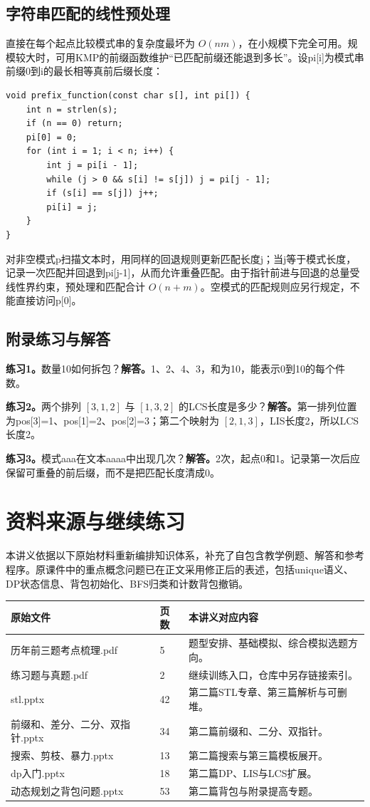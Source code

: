 \subsection{字符串匹配的线性预处理}
直接在每个起点比较模式串的复杂度最坏为 $O(nm)$，在小规模下完全可用。规模较大时，可用KMP的前缀函数维护“已匹配前缀还能退到多长”。设pi[i]为模式串前缀0到i的最长相等真前后缀长度：
\begin{lstlisting}
void prefix_function(const char s[], int pi[]) {
    int n = strlen(s);
    if (n == 0) return;
    pi[0] = 0;
    for (int i = 1; i < n; i++) {
        int j = pi[i - 1];
        while (j > 0 && s[i] != s[j]) j = pi[j - 1];
        if (s[i] == s[j]) j++;
        pi[i] = j;
    }
}
\end{lstlisting}
对非空模式p扫描文本时，用同样的回退规则更新匹配长度j；当j等于模式长度，记录一次匹配并回退到pi[j-1]，从而允许重叠匹配。由于指针前进与回退的总量受线性界约束，预处理和匹配合计 $O(n+m)$。空模式的匹配规则应另行规定，不能直接访问p[0]。

\subsection{附录练习与解答}
\textbf{练习1。}数量10如何拆包？\textbf{解答。}1、2、4、3，和为10，能表示0到10的每个件数。

\textbf{练习2。}两个排列 $[3,1,2]$ 与 $[1,3,2]$ 的LCS长度是多少？\textbf{解答。}第一排列位置为pos[3]=1、pos[1]=2、pos[2]=3；第二个映射为 $[2,1,3]$，LIS长度2，所以LCS长度2。

\textbf{练习3。}模式aaa在文本aaaa中出现几次？\textbf{解答。}2次，起点0和1。记录第一次后应保留可重叠的前后缀，而不是把匹配长度清成0。
\newpage
\section{资料来源与继续练习}
本讲义依据以下原始材料重新编排知识体系，补充了自包含教学例题、解答和参考程序。原课件中的重点概念问题已在正文采用修正后的表述，包括unique语义、DP状态信息、背包初始化、BFS归类和计数背包撤销。

\begin{longtable}{P{7.4cm}P{1cm}P{6cm}}
\toprule 原始文件 & 页数 & 本讲义对应内容\\\midrule\endhead
历年前三题考点梳理.pdf & 5 & 题型安排、基础模拟、综合模拟选题方向。\\
练习题与真题.pdf & 2 & 继续训练入口，仓库中另存链接索引。\\
stl.pptx & 42 & 第二篇STL专章、第三篇解析与可删堆。\\
前缀和、差分、二分、双指针.pptx & 34 & 第二篇前缀和、二分、双指针。\\
搜索、剪枝、暴力.pptx & 13 & 第二篇搜索与第三篇模板展开。\\
dp入门.pptx & 18 & 第二篇DP、LIS与LCS扩展。\\
动态规划之背包问题.pptx & 53 & 第二篇背包与附录提高专题。\\
\bottomrule
\end{longtable}

